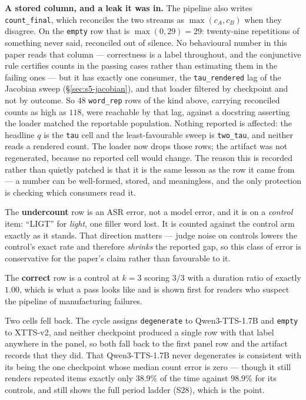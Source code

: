 \documentclass[11pt]{article}
\begin{document}
\textbf{A stored column, and a leak it was in.} The pipeline also writes
\texttt{count\_final}, which reconciles the two streams as $\max(c_A,c_B)$ when
they disagree. On the \texttt{empty} row that is $\max(0,29){=}29$: twenty-nine
repetitions of something never said, reconciled out of silence. No behavioural
number in this paper reads that column --- correctness is a label throughout,
and the conjunctive rule certifies counts in the passing cases rather than
estimating them in the failing ones --- but it has exactly one consumer, the
\texttt{tau\_rendered} lag of the Jacobian sweep (\S\ref{sec:s5-jacobian}), and
that loader filtered by checkpoint and not by outcome. So $48$ \texttt{word\_rep}
rows of the kind above, carrying reconciled counts as high as $118$, were
reachable by that lag, against a docstring asserting the loader matched the
reportable population. Nothing reported is affected: the headline $q$ is the
\texttt{tau} cell and the least-favourable sweep is \texttt{two\_tau}, and
neither reads a rendered count. The loader now drops those rows; the artifact
was not regenerated, because no reported cell would change. The reason this is
recorded rather than quietly patched is that it is the same lesson as the row it
came from --- a number can be well-formed, stored, and meaningless, and the only
protection is checking which consumers read it.

The \textbf{undercount} row is an ASR error, not a model error, and it is on a
\emph{control} item: ``LIGT'' for \emph{light}, one filler word lost. It is
counted against the control arm exactly as it stands. That direction matters ---
judge noise on controls lowers the control's exact rate and therefore
\emph{shrinks} the reported gap, so this class of error is conservative for the
paper's claim rather than favourable to it.

The \textbf{correct} row is a control at $k{=}3$ scoring $3/3$ with a duration
ratio of exactly $1.00$, which is what a pass looks like and is shown first for
readers who suspect the pipeline of manufacturing failures.

Two cells fell back. The cycle assigns \texttt{degenerate} to Qwen3-TTS-1.7B and
\texttt{empty} to XTTS-v2, and neither checkpoint produced a single row with
that label anywhere in the panel, so both fall back to the first panel row and
the artifact records that they did. That Qwen3-TTS-1.7B never degenerates is
consistent with its being the one checkpoint whose median count error is zero
--- though it still renders repeated items exactly only $38.9\%$ of the time
against $98.9\%$ for its controls, and still shows the full period ladder (S28),
which is the point.
\end{document}

